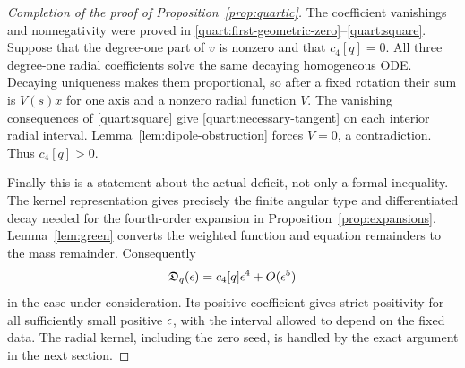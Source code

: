 \begin{proof}[Completion of the proof of Proposition~\ref{prop:quartic}]
The coefficient vanishings and nonnegativity were proved in
\eqref{quart:first-geometric-zero}--\eqref{quart:square}.  Suppose
that the degree-one part of \(v\) is nonzero and that \(c_4[q]=0\).
All three degree-one radial coefficients solve the same decaying
homogeneous ODE.  Decaying uniqueness makes them proportional, so
after a fixed rotation their sum is \(V(s)x\) for one axis and a
nonzero radial function \(V\).  The vanishing consequences of
\eqref{quart:square} give \eqref{quart:necessary-tangent} on each
interior radial interval.  Lemma~\ref{lem:dipole-obstruction} forces
\(V=0\), a contradiction.  Thus \(c_4[q]>0\).

Finally this is a statement about the actual deficit, not only a
formal inequality.  The kernel representation gives precisely the
finite angular type and differentiated decay needed for the
fourth-order expansion in Proposition~\ref{prop:expansions}.
Lemma~\ref{lem:green} converts the weighted function and equation
remainders to the mass remainder.  Consequently
\[
 \mathfrak D_q(\epsilon)=c_4[q]\epsilon^4+O(\epsilon^5)
\]
in the case under consideration.  Its positive coefficient gives
strict positivity for all sufficiently small positive \(\epsilon\),
with the interval allowed to depend on the fixed data.  The radial
kernel, including the zero seed, is handled by the exact argument in
the next section.
\end{proof}
